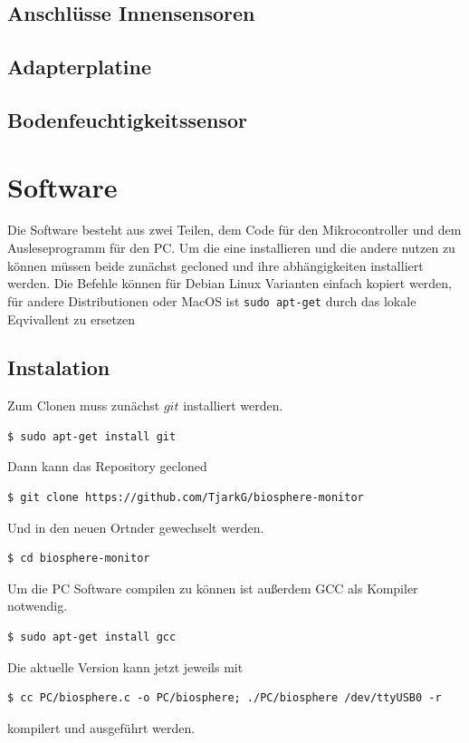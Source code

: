 \documentclass[12pt, a4paper, oneside]{report}
\begin{document}
\section{Anschlüsse Innensensoren}
\label{sec:Innensensoren}

\section{Adapterplatine}
\label{sec:Adapterplatine}

\section{Bodenfeuchtigkeitssensor}
\label{sec:Bodenfeuchtigkeitssensor}

\chapter{Software}
Die Software besteht aus zwei Teilen, dem Code für den Mikrocontroller und dem Ausleseprogramm für den PC. Um die eine installieren und die andere nutzen zu können müssen beide zunächst gecloned und ihre abhängigkeiten installiert werden. Die Befehle können für Debian Linux Varianten einfach kopiert werden, für andere Distributionen oder MacOS ist \lstinline|sudo apt-get| durch das lokale Eqvivallent zu ersetzen
\section{Instalation}
Zum Clonen muss zunächst $git$ installiert werden.
\begin{lstlisting}
$ sudo apt-get install git
\end{lstlisting}
Dann kann das Repository gecloned
\begin{lstlisting}
$ git clone https://github.com/TjarkG/biosphere-monitor
\end{lstlisting}
Und in den neuen Ortnder gewechselt werden.
\begin{lstlisting}
$ cd biosphere-monitor
\end{lstlisting}
Um die PC Software compilen zu können ist außerdem GCC als Kompiler notwendig.
\begin{lstlisting}
$ sudo apt-get install gcc
\end{lstlisting}
Die aktuelle Version kann jetzt jeweils mit
\begin{lstlisting}
$ cc PC/biosphere.c -o PC/biosphere; ./PC/biosphere /dev/ttyUSB0 -r
\end{lstlisting}
kompilert und ausgeführt werden. 
\end{document}
